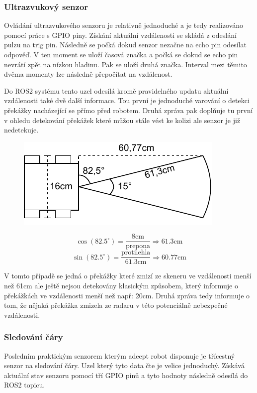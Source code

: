 \subsubsection*{Ultrazvukový senzor}
Ovládání ultrazvukového senzoru je relativně jednoduché a je tedy realizováno pomocí práce s GPIO piny. Získání aktuální vzdálenosti se skládá z odeslání pulzu na trig pin. Následně se počká dokud senzor nezačne na echo pin odesílat odpověď. V ten moment se uloží časová značka a počká se dokud se echo pin nevrátí zpět na nízkou hladinu. Pak se uloží druhá značka. Interval mezi těmito dvěma momenty lze následně přepočítat na vzdálenost.

Do ROS2 systému tento uzel odesílá kromě pravidelného updatu aktuální vzdálenosti také dvě další informace. Tou první je jednoduché varování o detekci překážky nacházející se přímo před robotem. Druhá zpráva pak doplňuje tu první v ohledu detekování překážek které můžou stále vést ke kolizi ale senzor je již nedetekuje. 

\begin{figure}[h!]
	\centering
	\begin{minipage}[c]{0.5\textwidth}
		\centering
		\includegraphics[scale=1.0]{obrazky-figures/ultrasonic_blind_spot.pdf}
	\end{minipage}%
	\begin{minipage}[c]{0.5\textwidth}
			$$\cos(82.5^\circ) = \frac{8\text{cm}}{\text{prepona}} \Rightarrow 61.3\text{cm}$$
			$$\sin(82.5^\circ) = \frac{\text{protilehla}}{61.3\text{cm}} \Rightarrow 60.77\text{cm}$$
	\end{minipage}
	\caption{}
	\label{}
\end{figure}

V tomto případě se jedná o překážky které zmizí ze skeneru ve vzdálenosti menší než 61cm ale ještě nejsou detekovány klasickým způsobem, který informuje o překážkách ve vzdálenosti menší než např: 20cm. Druhá zpráva tedy informuje o tom, že nějaká překážka zmizela ze radaru v této potenciálně nebezpečné vzdálenosti.

\subsubsection*{Sledování čáry}
Posledním praktickým senzorem kterým adeept robot disponuje je třícestný senzor na sledování čáry. Uzel který tyto data čte je velice jednoduchý. Získává aktuální stav senzoru pomocí tří GPIO pinů a tyto hodnoty následně odesílá do ROS2 topicu.


